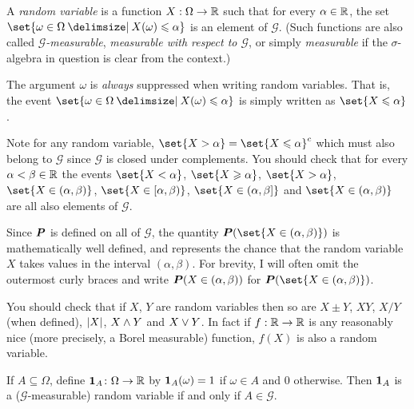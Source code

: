 \begin{definition}
  A \emph{random variable} is a function $X:\Omega \to \R$ such that for every $\alpha \in \R$, the set $\set{ \omega \in \Omega \st X(\omega) \leq \alpha }$ is an element of $\mathcal G$.
  (Such functions are also called \emph{$\mathcal G$-measurable}, \emph{measurable with respect to $\mathcal G$}, or simply \emph{measurable} if the $\sigma$-algebra in question is clear from the context.)
\end{definition}
\begin{remark}
  The argument $\omega$ is \emph{always} suppressed when writing random variables.
  That is, the event $\set{\omega \in \Omega \st X(\omega) \leq \alpha}$ is simply written as $\set{X \leq \alpha}$.
\end{remark}
\begin{remark}
  Note for any random variable, $\set{X > \alpha} = \set{X \leq \alpha}^c$ which must also belong to $\mathcal G$ since $\mathcal G$ is closed under complements.
  You should check that for every $\alpha < \beta \in \R$ the events $\set{X < \alpha}$, $\set{X \geq \alpha}$, $\set{X > \alpha}$, $\set{X \in (\alpha, \beta)}$, $\set{X \in [\alpha, \beta)}$, $\set{X \in (\alpha, \beta]}$ and $\set{X \in (\alpha, \beta)}$ are all also elements of $\mathcal G$.

  Since $\P$ is defined on all of $\mathcal G$, the quantity $\P( \set{X \in (\alpha, \beta)})$ is mathematically well defined, and represents the chance that the random variable $X$ takes values in the interval $(\alpha, \beta)$.
  For brevity, I will often omit the outermost curly braces and write $\P(X \in (\alpha, \beta))$ for $\P(\set{X \in (\alpha, \beta)})$.
\end{remark}

\begin{remark}
  You should check that if $X$, $Y$ are random variables then so are $X \pm Y$, $XY$, $X/Y$ (when defined), $\abs{X}$, $X \varmin Y$ and $X \varmax Y$.
  In fact if $f: \R \to \R$ is any reasonably nice (more precisely, a Borel measurable) function, $f(X)$ is also a random variable.
\end{remark}

\begin{example}
  If $A \subseteq \Omega$, define $\one_A\colon \Omega \to \R$ by $\one_A(\omega) = 1$ if $\omega \in A$ and $0$ otherwise.
  Then $\one_A$ is a ($\mathcal G$-measurable) random variable if and only if $A \in \mathcal G$.
\end{example}

